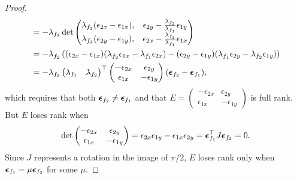 \begin{proof}
\begin{align*}
		&= -\lambda_{f_1} \det{\begin{pmatrix}\lambda_{f_2}(\epsilon_{2x}-\epsilon_{1x}), & \epsilon_{2y}-\frac{\lambda_{f_2}}{\lambda_{f_1}}\epsilon_{1y} \\ \lambda_{f_2}(\epsilon_{2y}-\epsilon_{1y}), & \epsilon_{2x}-\frac{\lambda_{f_2}}{\lambda_{f_1}}\epsilon_{1x}\end{pmatrix}} \\
		&=-\lambda_{f_2}\left((\epsilon_{2x}-\epsilon_{1x})(\lambda_{f_2}\epsilon_{1x}-\lambda_{f_1}\epsilon_{2x}) -(\epsilon_{2y}-\epsilon_{1y})(\lambda_{f_1}\epsilon_{2y}-\lambda_{f_2}\epsilon_{1y}) \right) \\
		&= -\lambda_{f_2}\begin{pmatrix} \lambda_{f_1} & \lambda_{f_2}\end{pmatrix}^\top \begin{pmatrix} -\epsilon_{2x} & \epsilon_{2y} \\ \epsilon_{1x} & -\epsilon_{1y} \end{pmatrix}(\boldsymbol{\epsilon}_{f_2}-\boldsymbol{\epsilon}_{f_1}),
	\end{align*}
	which requires that both $\boldsymbol{\epsilon}_{f_2}\neq\boldsymbol{\epsilon}_{f_1}$ and that $E=\begin{pmatrix}-\epsilon_{2x} & \epsilon_{2y} \\ \epsilon_{1x} & -\epsilon_{1y} \end{pmatrix}$ is full rank.  But $E$ loses rank when
	\[
	\det{\begin{pmatrix}-\epsilon_{2x} & \epsilon_{2y} \\ \epsilon_{1x} & -\epsilon_{1y} \end{pmatrix}} 
		= \epsilon_{2x}\epsilon_{1y}-\epsilon_{1x}\epsilon_{2y}
		= \boldsymbol{\epsilon}_{f_1}^\top J \boldsymbol{\epsilon}_{f_2} = 0.
	\]
	Since $J$ represents a rotation in the image of $\pi/2$, $E$ loses rank only when $\boldsymbol{\epsilon}_{f_1}=\mu\boldsymbol{\epsilon}_{f_2}$ for some $\mu$.
\end{proof}

